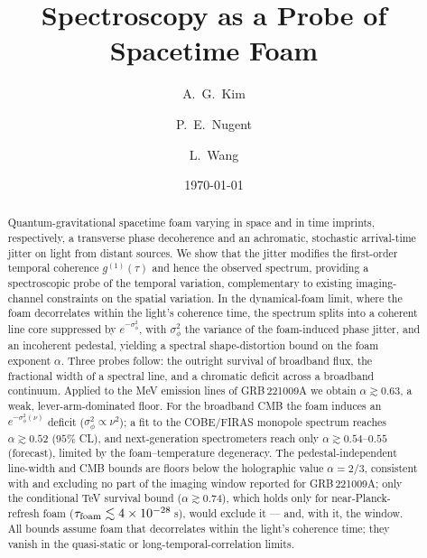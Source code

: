 \documentclass[aps,prd,onecolumn,amsmath,amssymb]{revtex4-2}
\begin{document}
\title{Spectroscopy as a Probe of Spacetime Foam}

\author{A.\ G.\ Kim}
\author{P.\ E.\ Nugent}
\author{L.\ Wang}

\date{\today}

\begin{abstract}
Quantum-gravitational spacetime foam varying in space and in time
imprints, respectively, a transverse phase decoherence and an achromatic,
stochastic arrival-time jitter on light from distant
sources. We show that
the jitter
modifies the first-order temporal coherence $g^{(1)}(\tau)$ and hence the
observed spectrum, providing a spectroscopic probe of the temporal
variation, complementary to existing
imaging-channel constraints on the spatial variation. In the
dynamical-foam limit, where the foam decorrelates within the light's
coherence time,
the spectrum splits into a coherent line core suppressed
by $e^{-\sigma_\phi^2}$, with $\sigma_\phi^2$ the variance of the foam-induced
phase jitter, and an incoherent pedestal, yielding a spectral
shape-distortion bound on the foam exponent $\alpha$.
Three probes follow: the outright survival of broadband flux, the
fractional width of a spectral line, and a chromatic deficit across a
broadband continuum.
Applied to the MeV emission lines of GRB\,221009A we obtain
$\alpha \gtrsim 0.63$, a weak, lever-arm-dominated floor.
For the broadband CMB the foam induces an $e^{-\sigma_\phi^2(\nu)}$ deficit
($\sigma_\phi^2 \propto \nu^2$); a fit to
the COBE/FIRAS monopole spectrum reaches $\alpha \gtrsim 0.52$
($95\%$ CL), and next-generation spectrometers reach only
$\alpha\gtrsim 0.54$--$0.55$ (forecast), limited by the foam--temperature
degeneracy.  The pedestal-independent line-width and CMB bounds are floors below
the holographic value $\alpha = 2/3$, consistent with and excluding no part of
the imaging window reported for GRB\,221009A; only the conditional TeV
survival bound ($\alpha\gtrsim0.74$), which holds only for
near-Planck-refresh foam ($\tau_{\rm foam}\lesssim4\times10^{-28}$\,s), would
exclude it --- and, with it, the window.
All bounds assume foam that decorrelates within the light's coherence
time; they vanish in the quasi-static or long-temporal-correlation limits.
\end{abstract}
\end{document}
